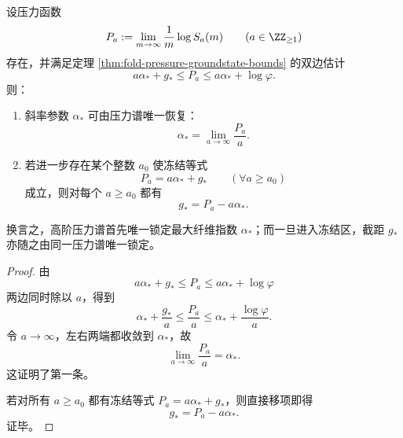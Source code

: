 \begin{theorem}\label{thm:xi-time-part57b-pressure-spectrum-slope-intercept-recovery}
设压力函数
\[
P_a:=\lim_{m\to\infty}\frac1m\log S_a(m)
\qquad(a\in\ZZ_{\ge 1})
\]
存在，并满足定理 \ref{thm:fold-pressure-groundstate-bounds} 的双边估计
\[
a\alpha_*+g_*\le P_a\le a\alpha_*+\log\varphi.
\]
则：
\begin{enumerate}
  \item 斜率参数 \(\alpha_*\) 可由压力谱唯一恢复：
  \[
  \boxed{\;
  \alpha_*=\lim_{a\to\infty}\frac{P_a}{a}.\;}
  \]
  \item 若进一步存在某个整数 \(a_0\) 使冻结等式
  \[
  P_a=a\alpha_*+g_*
  \qquad(\forall a\ge a_0)
  \]
  成立，则对每个 \(a\ge a_0\) 都有
  \[
  \boxed{\;
  g_*=P_a-a\alpha_*.\;}
  \]
\end{enumerate}
换言之，高阶压力谱首先唯一锁定最大纤维指数 \(\alpha_*\)；而一旦进入冻结区，截距 \(g_*\) 亦随之由同一压力谱唯一锁定。
\end{theorem}
\begin{proof}
由
\[
a\alpha_*+g_*\le P_a\le a\alpha_*+\log\varphi
\]
两边同时除以 \(a\)，得到
\[
\alpha_*+\frac{g_*}{a}\le \frac{P_a}{a}\le \alpha_*+\frac{\log\varphi}{a}.
\]
令 \(a\to\infty\)，左右两端都收敛到 \(\alpha_*\)，故
\[
\lim_{a\to\infty}\frac{P_a}{a}=\alpha_*.
\]
这证明了第一条。

若对所有 \(a\ge a_0\) 都有冻结等式 \(P_a=a\alpha_*+g_*\)，则直接移项即得
\[
g_*=P_a-a\alpha_*.
\]
证毕。
\end{proof}

